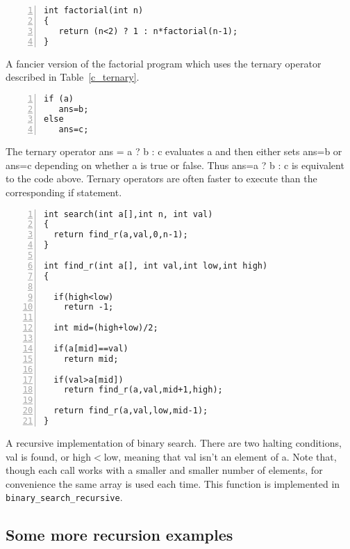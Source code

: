 \documentclass[11pt,a4paper]{scrartcl}
\begin{document}
\begin{table}
\begin{lstlisting}[numbers=left]
int factorial(int n)
{
   return (n<2) ? 1 : n*factorial(n-1);
}

\end{lstlisting}
\caption{A fancier version of the factorial program which uses the ternary operator described in Table~\ref{c_ternary}.\label{c_factorial_fancy}}
\end{table}
                  

   
\begin{table}
\begin{lstlisting}[numbers=left]
if (a)
   ans=b;
else 
   ans=c;
\end{lstlisting}
\caption{The ternary operator ans = a ? b : c evaluates a and then
  either sets ans=b or ans=c depending on whether a is true or
  false.  Thus ans=a ? b : c is equivalent to the code above. Ternary
  operators are often faster to execute than the corresponding if
  statement.\label{c_ternary}}
\end{table}
 


\begin{table}
\begin{lstlisting}[numbers=left]
int search(int a[],int n, int val)
{
  return find_r(a,val,0,n-1);
}
 
int find_r(int a[], int val,int low,int high)
{

  if(high<low)
    return -1;

  int mid=(high+low)/2;

  if(a[mid]==val)
    return mid;

  if(val>a[mid])
    return find_r(a,val,mid+1,high);
  
  return find_r(a,val,low,mid-1);
}
\end{lstlisting}
\caption{A recursive implementation of binary search. There are two
  halting conditions, val is found, or high$<$low, meaning that val
  isn't an element of a. Note that, though each call works with a
  smaller and smaller number of elements, for convenience the same
  array is used each time. This function is implemented in \texttt{
    binary\_search\_recursive}.\label{c_binary_search_recursive}}
\end{table}

\subsection*{Some more recursion examples}
\end{document}
